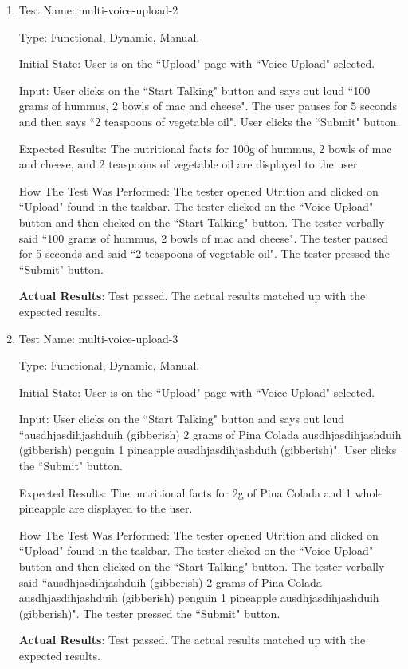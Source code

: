 \documentclass[12pt, titlepage]{article}
\begin{document}
\begin{enumerate}
		\item{Test Name: multi-voice-upload-2}
		
		Type: Functional, Dynamic, Manual.
		
		Initial State: User is on the ``Upload" page with ``Voice Upload" selected.
		
		Input: User clicks on the ``Start Talking" button and says out loud ``100 grams of hummus, 2 bowls of mac and cheese". The user pauses for 5 seconds and then says ``2 teaspoons of vegetable oil". User clicks the ``Submit" button.
		
		Expected Results: The nutritional facts for 100g of hummus, 2 bowls of mac and cheese, and 2 teaspoons of vegetable oil are displayed to the user.
		
		How The Test Was Performed: The tester opened Utrition and clicked on ``Upload" found in the taskbar. The tester clicked on the ``Voice Upload" button and then clicked on the ``Start Talking" button. The tester verbally said ``100 grams of hummus, 2 bowls of mac and cheese". The tester paused for 5 seconds and said ``2 teaspoons of vegetable oil". The tester pressed the ``Submit" button.
		
		\textbf{Actual Results}: Test passed. The actual results matched up with the expected results.
		
		\item{Test Name: multi-voice-upload-3}
		
		Type: Functional, Dynamic, Manual.
		
		Initial State: User is on the ``Upload" page with ``Voice Upload" selected.
		
		Input: User clicks on the ``Start Talking" button and says out loud ``ausdhjasdihjashduih (gibberish) 2 grams of Pina Colada ausdhjasdihjashduih (gibberish) penguin 1 pineapple ausdhjasdihjashduih (gibberish)". User clicks the ``Submit" button.
		
		Expected Results: The nutritional facts for 2g of Pina Colada and 1 whole pineapple are displayed to the user.
		
		How The Test Was Performed: The tester opened Utrition and clicked on ``Upload" found in the taskbar. The tester clicked on the ``Voice Upload" button and then clicked on the ``Start Talking" button. The tester verbally said ``ausdhjasdihjashduih (gibberish) 2 grams of Pina Colada ausdhjasdihjashduih (gibberish) penguin 1 pineapple ausdhjasdihjashduih (gibberish)". The tester pressed the ``Submit" button.
		
		\textbf{Actual Results}: Test passed. The actual results matched up with the expected results.
		
	\end{enumerate}
\end{document}
